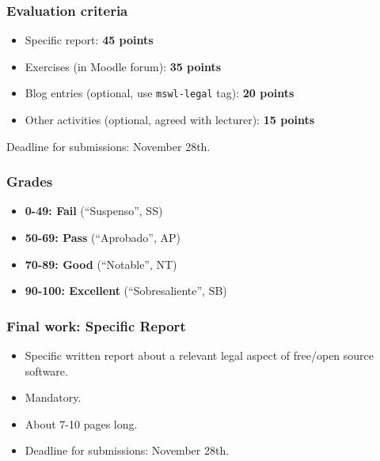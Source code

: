 \documentclass{beamer}
\begin{document}

\begin{frame}
\frametitle{Evaluation criteria}

\begin{itemize}
\item \alert{Specific report}: \textbf{45 points}
\item \alert{Exercises} (in Moodle forum): \textbf{35 points}
\item \alert{Blog entries} (optional, use \texttt{mswl-legal} tag): \textbf{20 points} 
\item \alert{Other activities} (optional, agreed with lecturer): \textbf{15 points} 
\end{itemize}

Deadline for submissions: \alert{November 28th}.

\end{frame}


\begin{frame}
\frametitle{Grades}

\begin{itemize}
\item \textbf{0-49: Fail} (``Suspenso'', SS)
\item \textbf{50-69: Pass} (``Aprobado'', AP)
\item \textbf{70-89: Good} (``Notable'', NT)
\item \textbf{90-100: Excellent} (``Sobresaliente'', SB)
\end{itemize}

\end{frame}



\begin{frame}
\frametitle{Final work: Specific Report}

\begin{itemize}
\item Specific written report about a relevant legal aspect of free/open source software. 
\item Mandatory.
\item About 7-10 pages long.
\item Deadline for submissions: \alert{November 28th}.
\end{itemize}

\end{frame}
\end{document}
